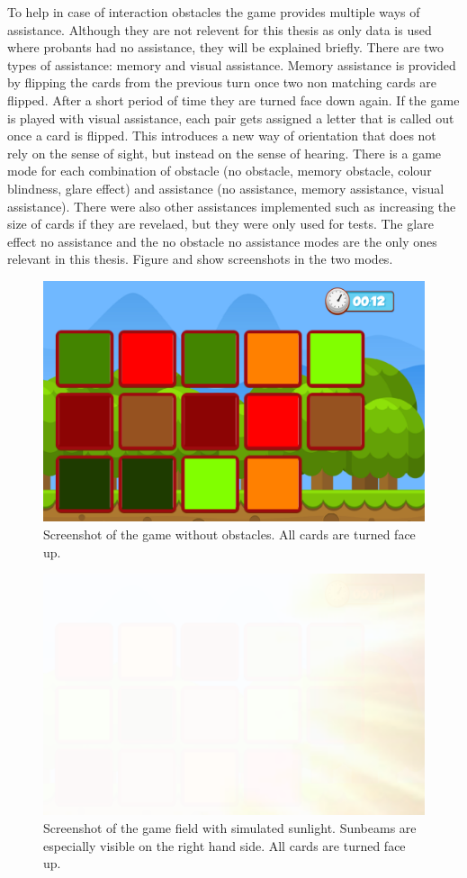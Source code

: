 To help in case of interaction obstacles the game provides multiple ways of assistance. Although they are not relevent for this thesis as only data is used where probants had no assistance, they will be explained briefly. There are two types of assistance: memory and visual assistance. Memory assistance is provided by flipping the cards from the previous turn once two non matching cards are flipped. After a short period of time they are turned face down again. If the game is played with visual assistance, each pair gets assigned a letter that is called out once a card is flipped. This introduces a new way of orientation that does not rely on the sense of sight, but instead on the sense of hearing. There is a game mode for each combination of obstacle (no obstacle, memory obstacle, colour blindness, glare effect) and assistance (no assistance, memory assistance, visual assistance). There were also other assistances implemented such as increasing the size of cards if they are revelaed, but they were only used for tests. The glare effect no assistance and the no obstacle no assistance modes are the only ones relevant in this thesis. Figure  and  show screenshots in the two modes. 

\begin{figure}[H]
	\centering
	\includegraphics[width=14cm]{images/noObstTurned.png}
	\caption[Bild kurz]{Screenshot of the game without obstacles. All cards are turned face up.}
	\label{fig:glareEffect}
\end{figure}

\begin{figure}[H]
	\centering
	\includegraphics[width=14cm]{images/glareEffect.png}
	\caption[Bild kurz]{Screenshot of the game field with simulated sunlight. Sunbeams are especially visible on the right hand side. All cards are turned face up.}
	\label{fig:glareEffect}
\end{figure}
